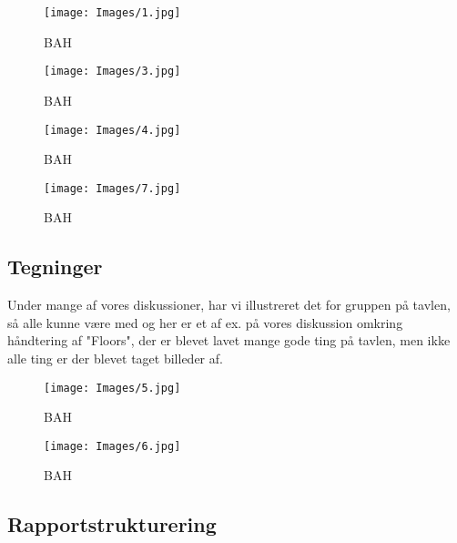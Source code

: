 \documentclass[a4paper,12pt, article]{memoir}
\begin{document}
        \begin{figure}
        \centering
            \begin{minipage}{0.45\textwidth}
                \centering
                \texttt{[image: Images/1.jpg]}
                \caption{BAH}
                \label{4}
            \end{minipage}
            \begin{minipage}{0.45\textwidth}
                \centering
                \texttt{[image: Images/3.jpg]}
                \caption{BAH}
                \label{4}
            \end{minipage}
            \begin{minipage}{0.45\textwidth}
                \centering
                \texttt{[image: Images/4.jpg]}
                \caption{BAH}
                \label{4}
            \end{minipage}
            \begin{minipage}{0.45\textwidth}
                \centering
                \texttt{[image: Images/7.jpg]}
                \caption{BAH}
                \label{4}
            \end{minipage}
        \end{figure}

        \subsection{Tegninger}
        Under mange af vores diskussioner, har vi illustreret det for gruppen på tavlen, så alle kunne være  med og her er et af ex. på vores diskussion omkring håndtering af "Floors", der er blevet lavet mange gode ting på tavlen, men ikke alle ting er der blevet taget billeder af.

        \begin{figure}[ht!]
            \centering
            \texttt{[image: Images/5.jpg]}
            \caption{BAH}
            \label{4}
        \end{figure}

        \begin{figure}[ht!]
            \centering
            \texttt{[image: Images/6.jpg]}
            \caption{BAH}
            \label{4}
        \end{figure}


        \subsection{Rapportstrukturering}
\end{document}
